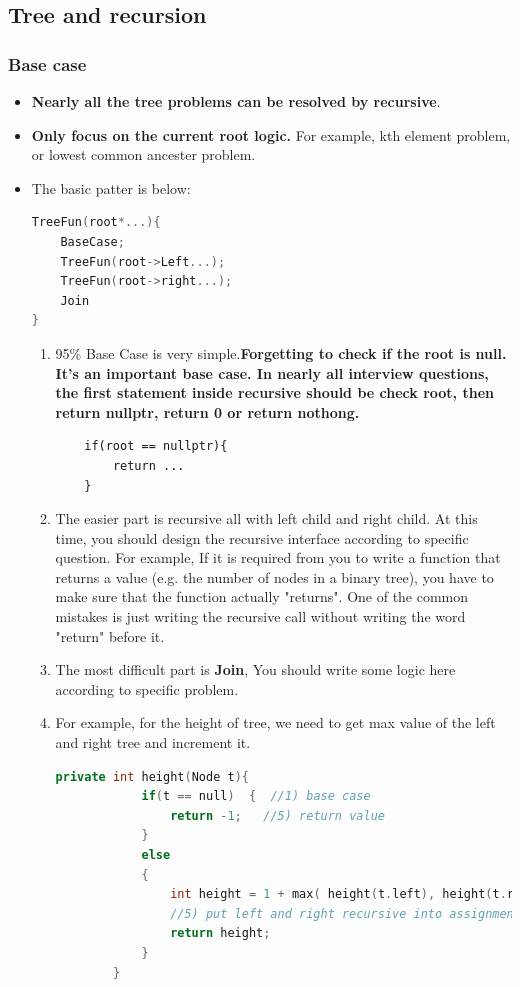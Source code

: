 \documentclass[a4paper,11pt,twoside]{book}
\begin{document}
\subsection{Tree and recursion} 
\subsubsection{Base case}


\begin{itemize}

\item \textbf{Nearly all the tree problems can be resolved by recursive}.

\item \textbf{Only focus on the current root logic.} For example, kth element problem, or lowest common ancester problem.

\item The basic patter is below: 
\begin{lstlisting}[frame=single, language=c++]
TreeFun(root*...){
	BaseCase;
	TreeFun(root->Left...);
	TreeFun(root->right...);
	Join
}
\end{lstlisting}

\begin{enumerate}
	\item 95\% Base Case is very simple.\textbf{Forgetting to check if the root is null. It's an important base case. In nearly all interview questions, the first statement inside recursive should be check root, then return nullptr, return 0 or return nothong.}
\begin{lstlisting}
	if(root == nullptr){
		return ...
	}
\end{lstlisting}
	
	\item The easier part is recursive all with left child and right child. At this time, you should design the recursive interface according to specific question. For example, If it is required from you to write a function that returns a value (e.g. the number of nodes in a binary tree), you have to make sure that the function actually "returns". One of the common mistakes is just writing the recursive call without writing the word "return" before it.
	
	\item The most difficult part is \textbf{Join}, You should write some logic here according to specific problem.
	
	\item For example, for the height of tree, we need to get max value of the left and right tree and increment it. 
	\begin{lstlisting}[frame=single, language=c++]
		private int height(Node t){
			if(t == null)  {  //1) base case
				return -1;   //5) return value 
			}
			else
			{
				int height = 1 + max( height(t.left), height(t.right) );
				//5) put left and right recursive into assignment
				return height;
			}
		}	
	\end{lstlisting}
	
\end{enumerate}

\end{itemize}
\end{document}
